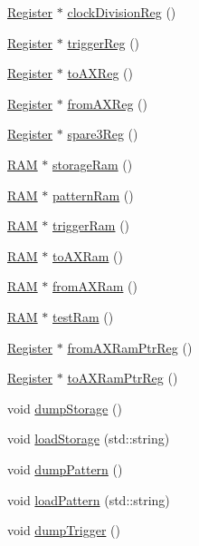 \begin{DoxyCompactItemize}
\hyperlink{classRegister}{Register} $\ast$ \hyperlink{classA3PE_a10cf30ff852d7580ba94dbee0c48e0d5}{clockDivisionReg} ()
\item 
\hyperlink{classRegister}{Register} $\ast$ \hyperlink{classA3PE_a4bf922f391fee6753fb0d53e133603b7}{triggerReg} ()
\item 
\hyperlink{classRegister}{Register} $\ast$ \hyperlink{classA3PE_a43b0006fafa3aeae353abb2ac30e872c}{toAXReg} ()
\item 
\hyperlink{classRegister}{Register} $\ast$ \hyperlink{classA3PE_a0b2fabe7e7941f33de210d9385b7afce}{fromAXReg} ()
\item 
\hyperlink{classRegister}{Register} $\ast$ \hyperlink{classA3PE_a979a9ac462eb55e611f6de4e94bad18e}{spare3Reg} ()
\item 
\hyperlink{classRAM}{RAM} $\ast$ \hyperlink{classA3PE_af241373059bad4a3c376ab2ac98a7b29}{storageRam} ()
\item 
\hyperlink{classRAM}{RAM} $\ast$ \hyperlink{classA3PE_a94ef54086baa29f7f6638c13d8906e56}{patternRam} ()
\item 
\hyperlink{classRAM}{RAM} $\ast$ \hyperlink{classA3PE_aad0f7ac467db22e5608ae6b0957665a1}{triggerRam} ()
\item 
\hyperlink{classRAM}{RAM} $\ast$ \hyperlink{classA3PE_a16b16ac12705b9dd93d70fa172deb584}{toAXRam} ()
\item 
\hyperlink{classRAM}{RAM} $\ast$ \hyperlink{classA3PE_a7c9026a74c1954b2d250be05fbc1c8c5}{fromAXRam} ()
\item 
\hyperlink{classRAM}{RAM} $\ast$ \hyperlink{classA3PE_a9327d0bd2efb5baa7c6b7de27bbc5997}{testRam} ()
\item 
\hyperlink{classRegister}{Register} $\ast$ \hyperlink{classA3PE_aad21357e25e3d4e2bed779040de52e13}{fromAXRamPtrReg} ()
\item 
\hyperlink{classRegister}{Register} $\ast$ \hyperlink{classA3PE_af6e9e980e871fcf0e1b35e1b4ae95ebe}{toAXRamPtrReg} ()
\item 
void \hyperlink{classA3PE_ad7999557f9d561dec67526730a3c97ef}{dumpStorage} ()
\item 
void \hyperlink{classA3PE_a8bd4a7a5dd8219f93386756c24a0f0b5}{loadStorage} (std::string)
\item 
void \hyperlink{classA3PE_a23da04d3c7e632dfb64e5ed4e21a21f3}{dumpPattern} ()
\item 
void \hyperlink{classA3PE_a522cba0a4d976eec59222504af188fb2}{loadPattern} (std::string)
\item 
void \hyperlink{classA3PE_aeab7701d0d1f6fd910e952b631769d42}{dumpTrigger} ()

\end{DoxyCompactItemize}

